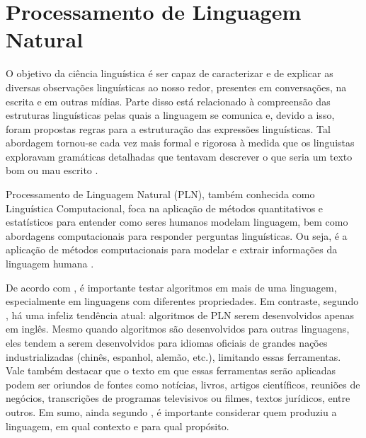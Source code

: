 \documentclass{automatextcc}
\begin{document}
\section{Processamento de Linguagem Natural}
O objetivo da ciência linguística é ser capaz de caracterizar e de explicar as diversas observações linguísticas ao nosso redor, presentes em conversações, na escrita e em outras mídias. Parte disso está relacionado à compreensão das estruturas linguísticas pelas quais a linguagem se comunica e, devido a isso, foram propostas regras para a estruturação das expressões linguísticas. Tal abordagem tornou-se cada vez mais formal e rigorosa à medida que os linguistas exploravam gramáticas detalhadas que tentavam descrever o que seria um texto bom ou mau escrito \citep{manning1999}.

Processamento de Linguagem Natural (PLN), também conhecida como Linguística Computacional, foca na aplicação de métodos quantitativos e estatísticos para entender como seres humanos modelam linguagem, bem como abordagens computacionais para responder perguntas linguísticas. Ou seja, é a aplicação de métodos computacionais para modelar e extrair informações da linguagem humana \citep{kamath2019}. 

De acordo com \citet{jurafsky2021}, é importante testar algoritmos em mais de uma linguagem, especialmente em linguagens com diferentes propriedades. Em contraste, segundo \citet{bender2019}, há uma infeliz tendência atual: algoritmos de PLN serem desenvolvidos apenas em inglês. Mesmo quando algoritmos são desenvolvidos para outras linguagens, eles tendem a serem desenvolvidos para idiomas oficiais de grandes nações industrializadas (chinês, espanhol, alemão, etc.), limitando essas ferramentas. Vale também destacar que o texto em que essas ferramentas serão aplicadas podem ser oriundos de fontes como notícias, livros, artigos científicos, reuniões de negócios, transcrições de programas televisivos ou filmes, textos jurídicos, entre outros. Em sumo, ainda segundo \citet{jurafsky2021}, é importante considerar quem produziu a linguagem, em qual contexto e para qual propósito.



\end{document}
